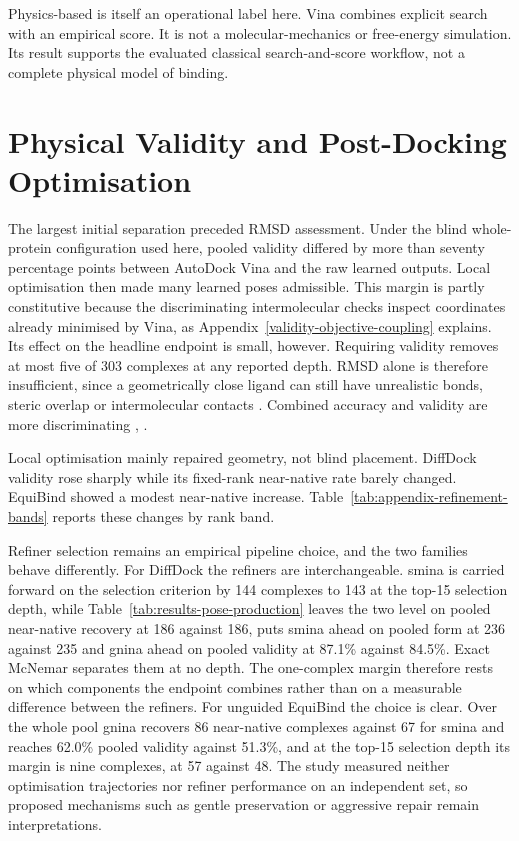 Physics-based is itself an operational label here. Vina combines explicit search with an empirical score. It is not a molecular-mechanics or free-energy simulation. Its result supports the evaluated classical search-and-score workflow, not a complete physical model of binding.

\hypertarget{physical-validity-and-post-docking-optimisation}{%
\section{Physical Validity and Post-Docking Optimisation}\label{physical-validity-and-post-docking-optimisation}}

The largest initial separation preceded RMSD assessment. Under the blind whole-protein configuration used here, pooled validity differed by more than seventy percentage points between AutoDock Vina and the raw learned outputs. Local optimisation then made many learned poses admissible. This margin is partly constitutive because the discriminating intermolecular checks inspect coordinates already minimised by Vina, as Appendix~\ref{validity-objective-coupling} explains. Its effect on the headline endpoint is small, however. Requiring validity removes at most five of 303 complexes at any reported depth. RMSD alone is therefore insufficient, since a geometrically close ligand can still have unrealistic bonds, steric overlap or intermolecular contacts \cite{ref035}. Combined accuracy and validity are more discriminating \cite{ref013}, \cite{ref032}.

Local optimisation mainly repaired geometry, not blind placement. DiffDock validity rose sharply while its fixed-rank near-native rate barely changed. EquiBind showed a modest near-native increase. Table~\ref{tab:appendix-refinement-bands} reports these changes by rank band.

Refiner selection remains an empirical pipeline choice, and the two families behave differently. For DiffDock the refiners are interchangeable. smina is carried forward on the selection criterion by 144 complexes to 143 at the top-15 selection depth, while Table~\ref{tab:results-pose-production} leaves the two level on pooled near-native recovery at 186 against 186, puts smina ahead on pooled form at 236 against 235 and gnina ahead on pooled validity at 87.1\% against 84.5\%. Exact McNemar separates them at no depth. The one-complex margin therefore rests on which components the endpoint combines rather than on a measurable difference between the refiners. For unguided EquiBind the choice is clear. Over the whole pool gnina recovers 86 near-native complexes against 67 for smina and reaches 62.0\% pooled validity against 51.3\%, and at the top-15 selection depth its margin is nine complexes, at 57 against 48. The study measured neither optimisation trajectories nor refiner performance on an independent set, so proposed mechanisms such as gentle preservation or aggressive repair remain interpretations.

